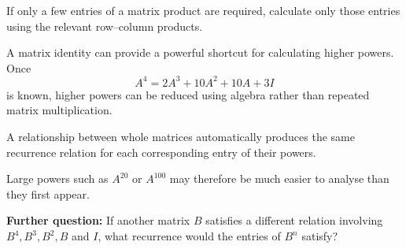 \begin{takeaways}
\item If only a few entries of a matrix product are required, calculate only those entries using the relevant row--column products. 
\item A matrix identity can provide a powerful shortcut for calculating higher powers. Once \[ A^4=2A^3+10A^2+10A+3I \] is known, higher powers can be reduced using algebra rather than repeated matrix multiplication. 
\item A relationship between whole matrices automatically produces the same recurrence relation for each corresponding entry of their powers. 
\item Large powers such as \(A^{20}\) or \(A^{100}\) may therefore be much easier to analyse than they first appear. 
\item \textbf{Further question:} If another matrix \(B\) satisfies a different relation involving \(B^4,B^3,B^2,B\) and \(I\), what recurrence would the entries of \(B^n\) satisfy? 
\end{takeaways}

